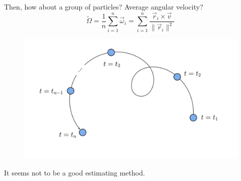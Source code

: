 \documentclass[11pt,]{beamer}
\begin{document}
\begin{frame}
	Then, how about a group of particles? Average angular velocity?
	\begin{equation}
	\tilde{\Omega} = \frac{1}{n}\sum_{i=1}^{n}\vec{\omega}_i 
	= \sum_{i=1}^{n}\frac{\vec{r}_i\times\vec{v}}{\lVert \vec{r}_i\lVert^2}
	\end{equation}

	\begin{figure}
    \includegraphics[page=4, width=0.65\linewidth]{imgs.pdf}
	\end{figure}
	
	It seems not to be a good estimating method.
\end{frame}
\end{document}
